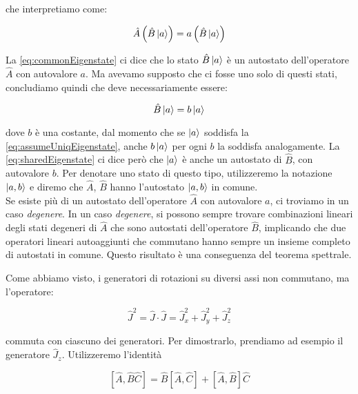 che interpretiamo come:

	\begin{equation} \label{eq:commonEigenstate}
		\hat{A} \left ( \hat{B} \ket{a} \right ) = a \left ( \hat{B} \ket{a} \right )
	\end{equation}

La \eqref{eq:commonEigenstate} ci dice che lo stato $\hat{B} \ket{a}$ \`e un autostato dell'operatore $\hat{A}$ con autovalore $a$. Ma avevamo supposto che ci fosse uno solo di questi stati, concludiamo quindi che deve necessariamente essere:

	\begin{equation} \label{eq:sharedEigenstate}
		\hat{B}\ket{a} = b \ket{a}
	\end{equation}

dove $b$ \`e una costante, dal momento che se $\ket{a}$ soddisfa la \eqref{eq:assumeUniqEigenstate}, anche $b \ket{a}$ per ogni $b$ la soddisfa analogamente. La \eqref{eq:sharedEigenstate} ci dice per\`o che $\ket{a}$ \`e anche un autostato di $\hat{B}$, con autovalore $b$. Per denotare uno stato di questo tipo, utilizzeremo la notazione $\ket{a, b}$ e diremo che $\hat{A}$, $\hat{B}$ hanno l'autostato $\ket{a, b}$ in comune. \\

Se esiste pi\`u di un autostato dell'operatore $\hat{A}$ con autovalore $a$, ci troviamo in un caso \textit{degenere}. In un caso \textit{degenere}, si possono sempre trovare combinazioni lineari degli stati degeneri di $\hat{A}$ che sono autostati dell'operatore $\hat{B}$, implicando che due operatori lineari autoaggiunti che commutano hanno sempre un insieme completo di autostati in comune. Questo risultato \`e una conseguenza del teorema spettrale.

Come abbiamo visto, i generatori di rotazioni su diversi assi non commutano, ma l'operatore:

	\begin{equation}
		\hat{J}^2 = \hat{J} \cdot \hat{J} = \hat{J}_x^2 + \hat{J}_y^2 + \hat{J}_z^2
	\end{equation}

commuta con ciascuno dei generatori. Per dimostrarlo, prendiamo ad esempio il generatore $\hat{J}_z$. Utilizzeremo l'identit\`a

	\begin{equation} \label{eq:commutatorsTrick}
		\left [ \hat{A}, \hat{B}\hat{C} \right ] = \hat{B} \left [ \hat{A}, \hat{C} \right ] + \left [ \hat{A}, \hat{B} \right ] \hat{C}
	\end{equation}


